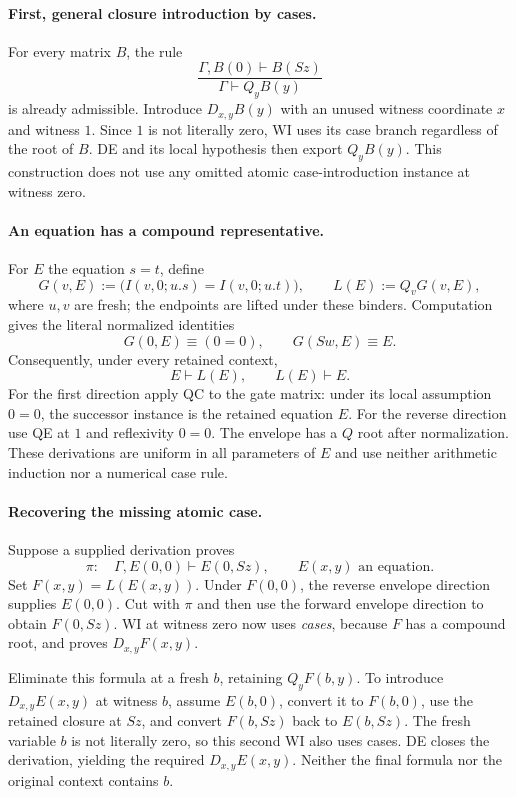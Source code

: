 \paragraph{First, general closure introduction by cases.}
For every matrix $B$, the rule
\[
 \frac{\Gamma,B(0)\vdash B(Sz)}{\Gamma\vdash Q_yB(y)}
 \tag{QC}\label{env:qc}
\]
is already admissible. Introduce $D_{x,y}B(y)$ with an unused witness
coordinate $x$ and witness $1$. Since $1$ is not literally zero, WI uses
its case branch regardless of the root of $B$. DE and its local hypothesis
then export $Q_yB(y)$. This construction does not use any omitted atomic
case-introduction instance at witness zero.

\paragraph{An equation has a compound representative.}
For $E$ the equation $s=t$, define
\[
 G(v,E):=\bigl(I(v,0;u.s)=I(v,0;u.t)\bigr),\qquad
 L(E):=Q_vG(v,E),
 \tag{Envelope}\label{env:lift}
\]
where $u,v$ are fresh; the endpoints are lifted under these binders.
Computation gives the literal normalized identities
\[
 G(0,E)\equiv(0=0),\qquad G(Sw,E)\equiv E.
\]
Consequently, under every retained context,
\[
 E\vdash L(E),\qquad L(E)\vdash E.
 \tag{Envelope equivalence}\label{env:equiv}
\]
For the first direction apply QC to the gate matrix: under its local
assumption $0=0$, the successor instance is the retained equation $E$.
For the reverse direction use QE at $1$ and reflexivity $0=0$.
The envelope has a $Q$ root after normalization. These derivations are
uniform in all parameters of $E$ and use neither arithmetic induction
nor a numerical case rule.

\paragraph{Recovering the missing atomic case.}
Suppose a supplied derivation proves
\[
 \pi:\quad\Gamma,E(0,0)\vdash E(0,Sz),
 \qquad E(x,y)\text{ an equation}.
\]
Set $F(x,y)=L(E(x,y))$. Under $F(0,0)$, the reverse envelope direction
supplies $E(0,0)$. Cut with $\pi$ and then use the forward envelope
direction to obtain $F(0,Sz)$. WI at witness zero now uses \emph{cases},
because $F$ has a compound root, and proves $D_{x,y}F(x,y)$.

Eliminate this formula at a fresh $b$, retaining $Q_yF(b,y)$. To introduce
$D_{x,y}E(x,y)$ at witness $b$, assume $E(b,0)$, convert it to $F(b,0)$,
use the retained closure at $Sz$, and convert $F(b,Sz)$ back to
$E(b,Sz)$. The fresh variable $b$ is not literally zero, so this second
WI also uses cases. DE closes the derivation, yielding the required
$D_{x,y}E(x,y)$. Neither the final formula nor the original context contains
$b$.

